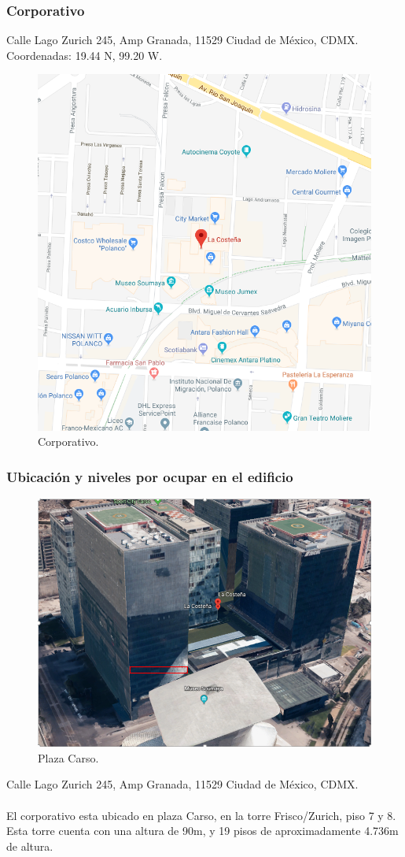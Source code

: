 \documentclass[12pt,letterpaper]{article}
\begin{document}
\subsubsection{Corporativo}
Calle Lago Zurich 245, Amp Granada, 11529 Ciudad de México, CDMX.
\\ Coordenadas: 19.44 N, 99.20 W.
\begin{figure}[ht]
    \centering
    \includegraphics[width=.7\textwidth]{imagenes/corporativo.png}
    \caption{Corporativo.}
\end{figure}

\newpage
\subsubsection{Ubicación y niveles por ocupar en el edificio}
\begin{figure}[ht]
    \centering
    \includegraphics[width=1\textwidth]{imagenes/edificios.png}
    \caption{Plaza Carso.}
\end{figure}
Calle Lago Zurich 245, Amp Granada, 11529 Ciudad de México, CDMX. 
\\ \\
El corporativo esta 
ubicado en plaza Carso, en la torre Frisco/Zurich, piso 7 y 8. Esta 
torre cuenta con una altura de 90m, y 19 pisos de aproximadamente 4.736m de altura.
\end{document}
